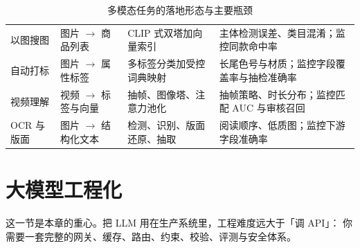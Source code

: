 \begin{table}[htbp]
\centering
\caption{多模态任务的落地形态与主要瓶颈}
\label{tab:multimodal}
\small
\begin{tabularx}{\textwidth}{L{2.2cm} L{2.4cm} L{2.4cm} Y}
\toprule
{} &  &  &  \\
\midrule
以图搜图 & 图片 $\to$ 商品列表 & CLIP 式双塔加向量索引 & 主体检测误差、类目混淆；监控同款命中率 \\
\addlinespace
自动打标 & 图片 $\to$ 属性标签 & 多标签分类加受控词典映射 & 长尾色号与材质；监控字段覆盖率与抽检准确率 \\
\addlinespace
视频理解 & 视频 $\to$ 标签与向量 & 抽帧、图像塔、注意力池化 & 抽帧策略、时长分布；监控匹配 AUC 与审核召回 \\
\addlinespace
OCR 与版面 & 图片 $\to$ 结构化文本 & 检测、识别、版面还原、抽取 & 阅读顺序、低质图；监控下游字段准确率 \\
\bottomrule
\end{tabularx}
\end{table}

\section{大模型工程化}

这一节是本章的重心。把 LLM 用在生产系统里，工程难度远大于「调 API」：
你需要一套完整的网关、缓存、路由、约束、校验、评测与安全体系。

